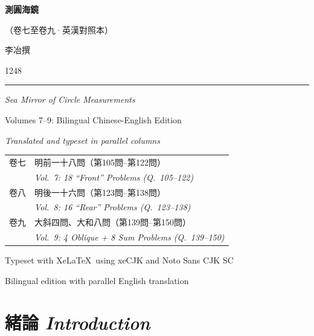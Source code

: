 \documentclass[11pt,a4paper]{article}
\newcommand{\shortline}{\noindent\rule{0.5\textwidth}{0.4pt}\par}
\newcommand{\bilingsec}[2]{%
  \section{\tradfont #1 \hfill\normalfont\normalsize\textit{#2}}%
}
\begin{document}
\begin{titlepage}
\centering
\vspace*{1cm}

{\Huge\bfseries\color{titlecolor}\tradfont 測圓海鏡}

\vspace{0.3cm}
{\Large\color{sectioncolor}\tradfont （卷七至卷九·英漢對照本）}

\vspace{1cm}
{\LARGE\tradfont 李冶\quad 撰}

\vspace{0.3cm}
{\large 1248}

\vspace{1cm}
\shortline

\vspace{0.5cm}
{\Large\textit{Sea Mirror of Circle Measurements}}

\vspace{0.3cm}
{\normalsize Volumes 7--9: Bilingual Chinese-English Edition}

\vspace{0.5cm}
{\small\textit{Translated and typeset in parallel columns}}

\vspace{1.5cm}
{\small\tradfont
\begin{tabular}{ll}
卷七 & 明前一十八問\quad（第105問--第122問）\\
     & \textit{Vol.~7: 18 ``Front'' Problems (Q.~105--122)}\\[0.3em]
卷八 & 明後一十六問\quad（第123問--第138問）\\
     & \textit{Vol.~8: 16 ``Rear'' Problems (Q.~123--138)}\\[0.3em]
卷九 & 大斜四問、大和八問\quad（第139問--第150問）\\
     & \textit{Vol.~9: 4 Oblique + 8 Sum Problems (Q.~139--150)}\\
\end{tabular}
}

\vfill
{\small Typeset with Xe\LaTeX\ using xeCJK and Noto Sans CJK SC}

\vspace{0.3cm}
{\small Bilingual edition with parallel English translation}

\end{titlepage}

\tableofcontents
\newpage

\bilingsec{緒論}{Introduction}
\end{document}
